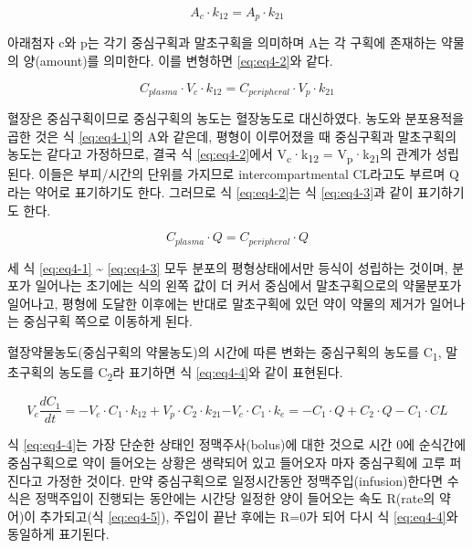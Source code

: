 \documentclass[
  11pt,
  krantz2, a4paper, twoside]{krantz}
\theoremstyle{definition}
\theoremstyle{definition}
\theoremstyle{definition}
\theoremstyle{definition}
\theoremstyle{remark}
\begin{document}
\begin{equation}
A_{c} \cdot k_{12} = A_{p} \cdot k_{21}
\label{eq:eq4-1}
\end{equation}

아래첨자 c와 p는 각기 중심구획과 말초구획을 의미하며 A는 각 구획에 존재하는 약물의 양(amount)를 의미한다. 이를 변형하면 \eqref{eq:eq4-2}와 같다.

\begin{equation}
C_{{plasma}} \cdot V_{c} \cdot k_{12} = C_{{peripheral}} \cdot V_{p} \cdot k_{21}
\label{eq:eq4-2}
\end{equation}

혈장은 중심구획이므로 중심구획의 농도는 혈장농도로 대신하였다. 농도와
분포용적을 곱한 것은 식 \eqref{eq:eq4-1}의 A와 같은데, 평형이 이루어졌을 때
중심구획과 말초구획의 농도는 같다고 가정하므로, 결국 식 \eqref{eq:eq4-2}에서
V\textsubscript{c}·k\textsubscript{12} = V\textsubscript{p}·k\textsubscript{21}의 관계가 성립된다. 이들은 부피/시간의 단위를
가지므로 intercompartmental CL라고도 부르며 Q라는 약어로
표기하기도 한다. 그러므로 식 \eqref{eq:eq4-2}는 식 \eqref{eq:eq4-3}과 같이 표기하기도 한다.

\begin{equation}
C_{{plasma}} \cdot Q = C_{{peripheral}} \cdot Q
\label{eq:eq4-3}
\end{equation}

세 식 \eqref{eq:eq4-1} \textasciitilde{} \eqref{eq:eq4-3} 모두 분포의 평형상태에서만 등식이 성립하는 것이며, 분포가 일어나는 초기에는 식의 왼쪽 값이 더 커서 중심에서 말초구획으로의 약물분포가 일어나고, 평형에 도달한 이후에는 반대로 말초구획에 있던 약이 약물의 제거가 일어나는 중심구획 쪽으로 이동하게 된다.

혈장약물농도(중심구획의 약물농도)의 시간에 따른 변화는 중심구획의 농도를 C\textsubscript{1}, 말초구획의 농도를 C\textsubscript{2}라 표기하면 식 \eqref{eq:eq4-4}와 같이 표현된다.

\begin{equation}
V_{c}\frac{{dC}_{1}}{{dt}} = {- V}_{c} \cdot C_{1} \cdot k_{12} + V_{p} \cdot C_{2} \cdot k_{21}{- V}_{c} \cdot C_{1} \cdot k_{e} 
= - C_{1} \cdot Q + C_{2} \cdot Q - C_{1} \cdot {CL}
\label{eq:eq4-4}
\end{equation}

식 \eqref{eq:eq4-4}는 가장 단순한 상태인 정맥주사(bolus)에 대한 것으로 시간 0에
순식간에 중심구획으로 약이 들어오는 상황은 생략되어 있고 들어오자 마자
중심구획에 고루 퍼진다고 가정한 것이다. 만약 중심구획으로 일정시간동안
정맥주입(infusion)한다면 수식은 정맥주입이 진행되는 동안에는 시간당
일정한 양이 들어오는 속도 R(rate의 약어)이 추가되고(식 \eqref{eq:eq4-5}), 주입이 끝난 후에는 R=0가
되어 다시 식 \eqref{eq:eq4-4}와 동일하게 표기된다.
\end{document}
